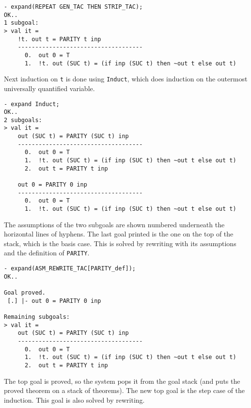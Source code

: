 \begin{session}
\begin{verbatim}
- expand(REPEAT GEN_TAC THEN STRIP_TAC);
OK..
1 subgoal:
> val it =
    !t. out t = PARITY t inp
    ------------------------------------
      0.  out 0 = T
      1.  !t. out (SUC t) = (if inp (SUC t) then ~out t else out t)
\end{verbatim}
\end{session}

\noindent Next induction on {\small\verb|t|} is done
using {\small\verb|Induct|}, which does
induction on the outermost universally quantified variable.

\begin{session}
\begin{verbatim}
- expand Induct;
OK..
2 subgoals:
> val it =
    out (SUC t) = PARITY (SUC t) inp
    ------------------------------------
      0.  out 0 = T
      1.  !t. out (SUC t) = (if inp (SUC t) then ~out t else out t)
      2.  out t = PARITY t inp

    out 0 = PARITY 0 inp
    ------------------------------------
      0.  out 0 = T
      1.  !t. out (SUC t) = (if inp (SUC t) then ~out t else out t)
\end{verbatim}
\end{session}

\noindent The assumptions of the two subgoals
are shown numbered underneath the horizontal lines of hyphens. The
last goal printed is the one on the top of the stack, which is the
basis case. This is solved by rewriting with its assumptions and the
definition of {\small\verb|PARITY|}.


\begin{session}
\begin{verbatim}
- expand(ASM_REWRITE_TAC[PARITY_def]);
OK..

Goal proved.
 [.] |- out 0 = PARITY 0 inp

Remaining subgoals:
> val it =
    out (SUC t) = PARITY (SUC t) inp
    ------------------------------------
      0.  out 0 = T
      1.  !t. out (SUC t) = (if inp (SUC t) then ~out t else out t)
      2.  out t = PARITY t inp
\end{verbatim}
\end{session}

The top goal is proved, so the system pops it from the goal stack (and
puts the proved theorem on a stack of theorems). The new top goal is
the step case of the induction. This goal is also solved by rewriting.

